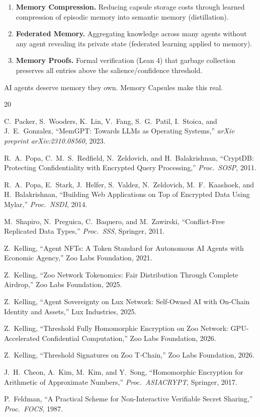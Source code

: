 \documentclass[11pt,letterpaper]{article}
\theoremstyle{definition}
\theoremstyle{remark}
\begin{document}
\begin{enumerate}
    \item \textbf{Memory Compression.} Reducing capsule storage costs through learned compression of episodic memory into semantic memory (distillation).
    \item \textbf{Federated Memory.} Aggregating knowledge across many agents without any agent revealing its private state (federated learning applied to memory).
    \item \textbf{Memory Proofs.} Formal verification (Lean 4) that garbage collection preserves all entries above the salience/confidence threshold.
\end{enumerate}

AI agents deserve memory they own. Memory Capsules make this real.

\begin{thebibliography}{20}

C.~Packer, S.~Wooders, K.~Lin, V.~Fang, S.~G.~Patil, I.~Stoica, and J.~E.~Gonzalez,
``MemGPT: Towards LLMs as Operating Systems,''
\textit{arXiv preprint arXiv:2310.08560}, 2023.

R.~A.~Popa, C.~M.~S.~Redfield, N.~Zeldovich, and H.~Balakrishnan,
``CryptDB: Protecting Confidentiality with Encrypted Query Processing,''
\textit{Proc.\ SOSP}, 2011.

R.~A.~Popa, E.~Stark, J.~Helfer, S.~Valdez, N.~Zeldovich, M.~F.~Kaashoek, and H.~Balakrishnan,
``Building Web Applications on Top of Encrypted Data Using Mylar,''
\textit{Proc.\ NSDI}, 2014.

M.~Shapiro, N.~Preguica, C.~Baquero, and M.~Zawirski,
``Conflict-Free Replicated Data Types,''
\textit{Proc.\ SSS}, Springer, 2011.

Z.~Kelling,
``Agent NFTs: A Token Standard for Autonomous AI Agents with Economic Agency,''
Zoo Labs Foundation, 2021.

Z.~Kelling,
``Zoo Network Tokenomics: Fair Distribution Through Complete Airdrop,''
Zoo Labs Foundation, 2025.

Z.~Kelling,
``Agent Sovereignty on Lux Network: Self-Owned AI with On-Chain Identity and Assets,''
Lux Industries, 2025.

Z.~Kelling,
``Threshold Fully Homomorphic Encryption on Zoo Network: GPU-Accelerated Confidential Computation,''
Zoo Labs Foundation, 2026.

Z.~Kelling,
``Threshold Signatures on Zoo T-Chain,''
Zoo Labs Foundation, 2026.

J.~H.~Cheon, A.~Kim, M.~Kim, and Y.~Song,
``Homomorphic Encryption for Arithmetic of Approximate Numbers,''
\textit{Proc.\ ASIACRYPT}, Springer, 2017.

P.~Feldman,
``A Practical Scheme for Non-Interactive Verifiable Secret Sharing,''
\textit{Proc.\ FOCS}, 1987.

\end{thebibliography}
\end{document}
